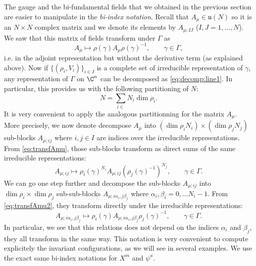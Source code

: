 \documentclass{worksheetclass}
\begin{document}
            The gauge and the bi-fundamental fields that we obtained in the previous section are easier to manipulate in the \emph{bi-index notation}. Recall that $A_\mu\in\mathfrak{u}(N)$ so it is an $N\times N$ complex matrix and we denote its elements by $A_{\mu;IJ}$ ($I,J=1,\dots,N$). We saw that this matrix of fields transform under $\Gamma$ as
            \begin{equation}
                A_\mu\mapsto \rho(\gamma)A_\mu \rho(\gamma)^{-1},\qquad \gamma\in \Gamma,\label{eq:transfAmu1}
            \end{equation}
            i.e. in the adjoint representation but without the derivative term (as explained above). Now if $\{(\rho_i,V_i)\}_{i\in I}$ is a complete set of irreducible representation of $\gamma$, any representation of $\Gamma$ on $\C^n$ can be decomposed as \eqref{eq:decomp:line1}. In particular, this provides us with the following partitioning of $N$:
            \begin{equation}
                N=\sum_{i\in}N_i\dim\rho_i.
            \end{equation}
            It is very convenient to apply the analogous partitionning for the matrix $A_\mu$. More precisely, we now denote decompose $A_\mu$ into $(\dim\rho_iN_i)\times(\dim\rho_jN_j)$ sub-blocks $A_{\mu;ij}$ where $i,j\in I$ are indices over the irreducible representations. From \eqref{eq:transfAmu}, those sub-blocks transform as direct sums of the same irreducible representations:
            \begin{equation}
                A_{\mu;ij}\mapsto \rho_i(\gamma)^{N_i}A_{\mu;ij}(\rho_j(\gamma)^{-1})^{N_j},\qquad \gamma\in\Gamma.\label{eq:transfAmu2}
            \end{equation}
            We can go one step further and decompose the sub-blocks $A_{\mu;ij}$ into $\dim\rho_i\times\dim\rho_j$ sub-sub-blocks $A_{\mu;i\alpha_i,j\beta_j}$ where $\alpha_i,\beta_i=0,\dots N_i-1$. From \eqref{eq:transfAmu2}, they transform directly under the irreducible representations:
            \begin{equation}
                \boxed{A_{\mu;i\alpha_i,j\beta_j}\mapsto\rho_i(\gamma)A_{\mu;i\alpha_i,j\beta_j}\rho_j(\gamma)^{-1},\qquad \gamma\in\Gamma.}
            \end{equation}
            In particular, we see that this relations does not depend on the indices $\alpha_i$ and $\beta_j$, they all transform in the same way. This notation is very convenient to compute explicitely the invariant configurations, as we will see in several examples. We use the exact same bi-index notations for $X^m$ and $\psi^a$.
\end{document}

